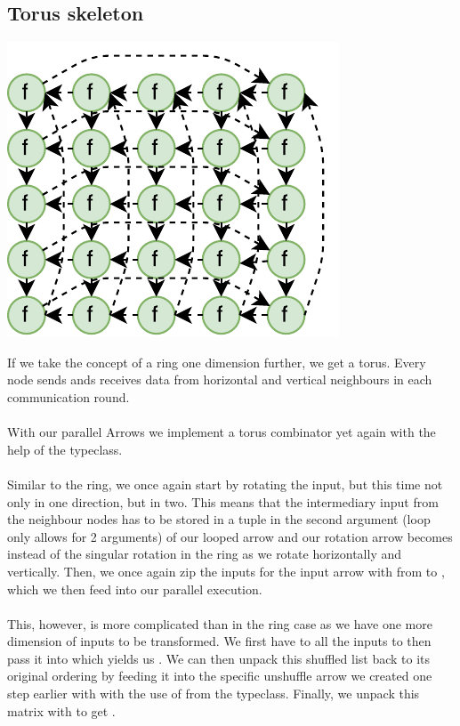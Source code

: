 \subsection{Torus skeleton}
\begin{center}
	\includegraphics[scale=0.75]{images/torus}
\end{center}
If we take the concept of a ring one dimension further, we get a torus. Every node sends ands receives data from horizontal and vertical neighbours in each communication round.
\\\\
With our parallel Arrows we implement a torus combinator yet again with the help of the  typeclass.
\\\\
Similar to the ring, we once again start by rotating the input, but this time not only in one direction, but in two. This means that the intermediary input from the neighbour nodes has to be stored in a tuple \code{([[fut a]], [[fut b]])} in the second argument (loop only allows for 2 arguments) of our looped arrow  and our rotation arrow becomes  instead of the singular rotation in the ring as we rotate \code{[[fut a]]} horizontally and \code{[[fut b]]} vertically. Then, we once again zip the inputs for the input arrow with  from \code{([[c]], ([[fut a]], [[fut b]]))} to , which we then feed into our parallel execution.
\\\\
This, however, is more complicated than in the ring case as we have one more dimension of inputs to be transformed. We first have to  all the inputs to then pass it into  which yields us . We can then unpack this shuffled list back to its original ordering by feeding it into the specific unshuffle arrow we created one step earlier with  with the use of  from the  typeclass. Finally, we unpack this matrix \code{[[[(d, fut a, fut b)]]} with  to get  \code{([[d]], ([[fut a]], [[fut b]]))}.
